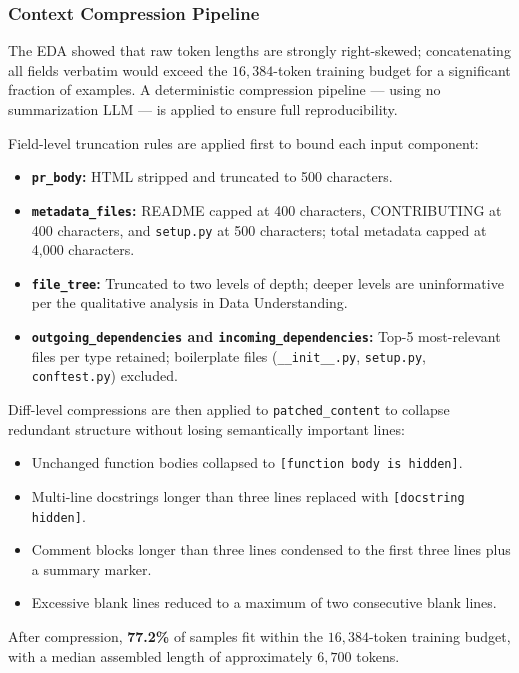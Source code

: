 \documentclass[11pt]{article}
\begin{document}
\subsubsection*{Context Compression Pipeline}

The EDA showed that raw token lengths are strongly right-skewed; concatenating all fields verbatim would exceed the $16{,}384$-token training budget for a significant fraction of examples. A deterministic compression pipeline — using no summarization LLM — is applied to ensure full reproducibility.

Field-level truncation rules are applied first to bound each input component:

\begin{itemize}
    \item \textbf{\texttt{pr\_body}:} HTML stripped and truncated to 500 characters.
    \item \textbf{\texttt{metadata\_files}:} README capped at 400 characters, CONTRIBUTING at 400 characters, and \texttt{setup.py} at 500 characters; total metadata capped at 4,000 characters.
    \item \textbf{\texttt{file\_tree}:} Truncated to two levels of depth; deeper levels are uninformative per the qualitative analysis in Data Understanding.
    \item \textbf{\texttt{outgoing\_dependencies} and \texttt{incoming\_dependencies}:} Top-5 most-relevant files per type retained; boilerplate files (\texttt{\_\_init\_\_.py}, \texttt{setup.py}, \texttt{conftest.py}) excluded.
\end{itemize}

Diff-level compressions are then applied to \texttt{patched\_content} to collapse redundant structure without losing semantically important lines:

\begin{itemize}
    \item Unchanged function bodies collapsed to \texttt{[function body is hidden]}.
    \item Multi-line docstrings longer than three lines replaced with \texttt{[docstring hidden]}.
    \item Comment blocks longer than three lines condensed to the first three lines plus a summary marker.
    \item Excessive blank lines reduced to a maximum of two consecutive blank lines.
\end{itemize}

After compression, \textbf{77.2\%} of samples fit within the $16{,}384$-token training budget, with a median assembled length of approximately $6{,}700$ tokens.
\end{document}

